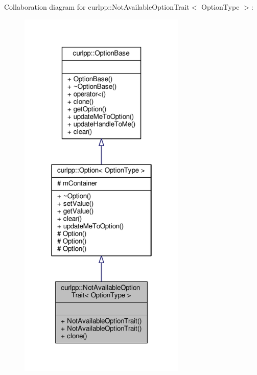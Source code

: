 Collaboration diagram for curlpp\-:\-:Not\-Available\-Option\-Trait$<$ Option\-Type $>$\-:\nopagebreak
\begin{figure}[H]
\begin{center}
\leavevmode
\includegraphics[width=226pt]{classcurlpp_1_1NotAvailableOptionTrait__coll__graph}
\end{center}
\end{figure}
